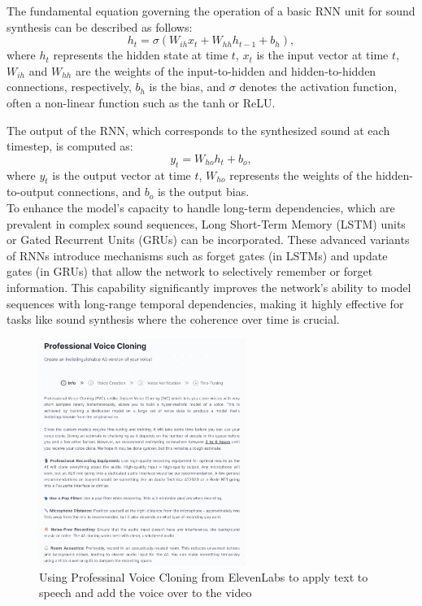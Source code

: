 \documentclass[11pt,a4paper,oneside]{report}
\begin{document}
The fundamental equation governing the operation of a basic RNN unit for sound synthesis can be described as follows:
\begin{equation}
h_t = \sigma(W_{ih} x_t + W_{hh} h_{t-1} + b_h),
\end{equation}
where $h_t$ represents the hidden state at time $t$, $x_t$ is the input vector at time $t$, $W_{ih}$ and $W_{hh}$ are the weights of the input-to-hidden and hidden-to-hidden connections, respectively, $b_h$ is the bias, and $\sigma$ denotes the activation function, often a non-linear function such as the tanh or ReLU.

The output of the RNN, which corresponds to the synthesized sound at each timestep, is computed as:
\begin{equation}
y_t = W_{ho} h_t + b_o,
\end{equation}
where $y_t$ is the output vector at time $t$, $W_{ho}$ represents the weights of the hidden-to-output connections, and $b_o$ is the output bias. \\
To enhance the model's capacity to handle long-term dependencies, which are prevalent in complex sound sequences, Long Short-Term Memory (LSTM) \cite{yu2019review} units or Gated Recurrent Units (GRUs) \cite{dey2017gate} can be incorporated. 
These advanced variants of RNNs introduce mechanisms such as forget gates (in LSTMs) and update gates (in GRUs) that allow the network to selectively remember or forget information. 
This capability significantly improves the network's ability to model sequences with long-range temporal dependencies, making it highly effective for tasks like sound synthesis where the coherence over time is crucial.

\begin{figure}[htbp]
  \centering
  \includegraphics[width=0.6\textwidth]{Voice Cloning.png}
  \caption{Using Professinal Voice Cloning from ElevenLabs to apply text to speech and add the voice over to the video}
\end{figure}
\end{document}
